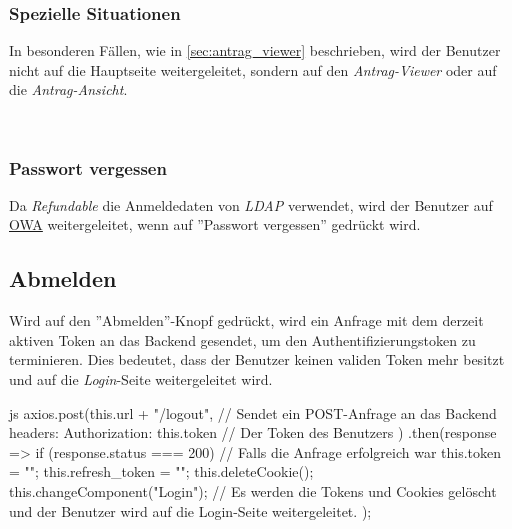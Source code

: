 \subsubsection{Spezielle Situationen}
In besonderen Fällen, wie in \autoref{sec:antrag_viewer} beschrieben, wird der Benutzer nicht auf die Hauptseite weitergeleitet, sondern auf den \textit{Antrag-Viewer} oder auf die \textit{Antrag-Ansicht}.
~\\
\subsubsection{Passwort vergessen}
Da \textit{Refundable} die Anmeldedaten von \textit{LDAP} verwendet, wird der Benutzer auf \href{https://owa.tgm.ac.at}{OWA} weitergeleitet, wenn auf ''Passwort vergessen'' gedrückt wird.
\newpage
\subsection{Abmelden}
Wird auf den ''Abmelden''-Knopf gedrückt, wird ein Anfrage mit dem derzeit aktiven Token an das Backend gesendet, um den Authentifizierungstoken zu terminieren. Dies bedeutet, dass der Benutzer keinen validen Token mehr besitzt und auf die \textit{Login}-Seite weitergeleitet wird.
\begin{code}{js}
axios.post(this.url + "/logout", {	// Sendet ein POST-Anfrage an das Backend
	headers: { Authorization: this.token }	// Der Token des Benutzers
})
.then(response => {
	if (response.status === 200) {	// Falls die Anfrage erfolgreich war
		this.token = "";
		this.refresh_token = "";
		this.deleteCookie();
		this.changeComponent("Login");	// Es werden die Tokens und Cookies gelöscht und der Benutzer wird auf die Login-Seite weitergeleitet.
	}
});
\end{code}
~\\
\newpage
